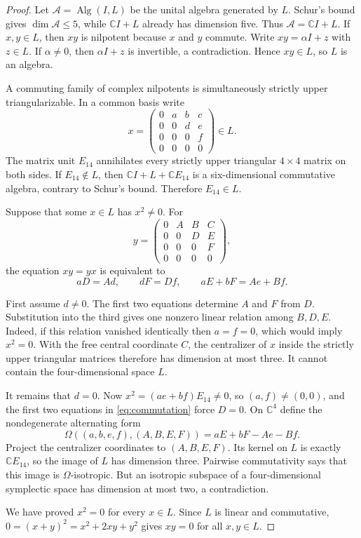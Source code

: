 \documentclass[11pt]{article}
\theoremstyle{remark}
\newcommand{\C}{\mathbb C}
\newcommand{\Alg}{\operatorname{Alg}}
\begin{document}
\begin{proof}
Let $\mathcal A=\Alg(I,L)$ be the unital algebra generated by $L$.  Schur's
bound gives $\dim\mathcal A\leq5$, while $\C I+L$ already has dimension five.
Thus $\mathcal A=\C I+L$.  If $x,y\in L$, then $xy$ is nilpotent because
$x$ and $y$ commute.  Write $xy=\alpha I+z$ with $z\in L$.  If
$\alpha\neq0$, then $\alpha I+z$ is invertible, a contradiction.  Hence
$xy\in L$, so $L$ is an algebra.

A commuting family of complex nilpotents is simultaneously strictly upper
triangularizable.  In a common basis write
\begin{equation}\label{eq:x-matrix}
x=\begin{pmatrix}
0&a&b&c\\0&0&d&e\\0&0&0&f\\0&0&0&0
\end{pmatrix}\in L.
\end{equation}
The matrix unit $E_{14}$ annihilates every strictly upper triangular
$4\times4$ matrix on both sides.  If $E_{14}\notin L$, then
$\C I+L+\C E_{14}$ is a six-dimensional commutative algebra, contrary to
Schur's bound.  Therefore $E_{14}\in L$.

Suppose that some $x\in L$ has $x^2\neq0$.  For
\[
y=\begin{pmatrix}
0&A&B&C\\0&0&D&E\\0&0&0&F\\0&0&0&0
\end{pmatrix},
\]
the equation $xy=yx$ is equivalent to
\begin{equation}\label{eq:commutation}
 aD=Ad,\qquad dF=Df,\qquad aE+bF=Ae+Bf.
\end{equation}

First assume $d\neq0$.  The first two equations determine $A$ and $F$ from
$D$.  Substitution into the third gives one nonzero linear relation among
$B,D,E$.  Indeed, if this relation vanished identically then $a=f=0$, which
would imply $x^2=0$.  With the free central coordinate $C$, the centralizer
of $x$ inside the strictly upper triangular matrices therefore has dimension
at most three.  It cannot contain the four-dimensional space $L$.

It remains that $d=0$.  Now
$x^2=(ae+bf)E_{14}\neq0$, so $(a,f)\neq(0,0)$, and the first two equations
in \eqref{eq:commutation} force $D=0$.  On $\C^4$ define the nondegenerate
alternating form
\[
 \Omega((a,b,e,f),(A,B,E,F))=aE+bF-Ae-Bf.
\]
Project the centralizer coordinates to $(A,B,E,F)$.  Its kernel on $L$ is
exactly $\C E_{14}$, so the image of $L$ has dimension three.  Pairwise
commutativity says that this image is $\Omega$-isotropic.  But an isotropic
subspace of a four-dimensional symplectic space has dimension at most two,
a contradiction.

We have proved $x^2=0$ for every $x\in L$.  Since $L$ is linear and
commutative,
$0=(x+y)^2=x^2+2xy+y^2$ gives $xy=0$ for all $x,y\in L$.
\end{proof}
\end{document}
